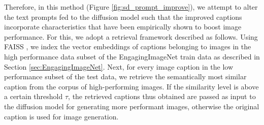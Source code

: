  Therefore, in this method (Figure \ref{fig:sd_prompt_improve}), we attempt to alter the text prompts fed to the diffusion model such that the improved captions 
incorporate characteristics that have been empirically shown to boost image performance.
 For this, we adopt a retrieval framework described as follows. Using FAISS \cite{johnson2019billion, douze2024faiss}, we index the vector embeddings of captions belonging to images in the high performance data subset of the EngagingImageNet train data as described in Section \ref{sec:EngagingImageNet}. Next, for every image caption in the low performance subset of the test data, we retrieve the semantically most similar caption from the corpus of high-performing images. If the similarity level is above a certain threshold $\tau$, the retrieved captions thus obtained are passed as input to the diffusion model for generating more performant images, otherwise the original caption is used for image generation.


 


